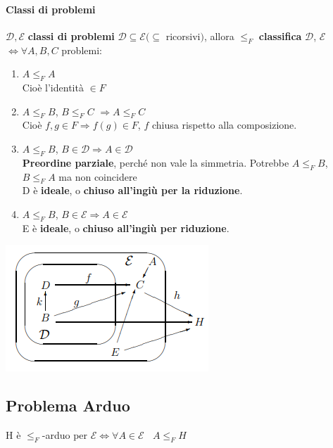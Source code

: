 \documentclass[10pt]{book}
\begin{document}
\paragraph{Classi di problemi} $\mathscr{D}, \mathscr{E}$ \textbf{classi di problemi} $\mathscr{D} \subseteq \mathscr{E} (\subseteq$ ricorsivi$)$, allora $\leq_F$ \textbf{classifica} $\mathscr{D}$, $\mathscr{E}$ $\Leftrightarrow \forall A, B, C$ problemi:
\begin{multicols}{2}
\begin{enumerate}
	\item $A \leq_F A$\\ Cioè l'identità $\in F$
	\item $A \leq_F B$, $B \leq_F C$ $\Rightarrow A \leq_F C$\\ Cioè $f, g \in F \Rightarrow f(g) \in F$, $f$ chiusa rispetto alla composizione.
	\item $A \leq_F B$, $B \in \mathscr{D} \Rightarrow A \in \mathscr{D}$\\
	\textbf{Preordine parziale}, perché non vale la simmetria. Potrebbe $A \leq_F B$, $B \leq_F A$ ma non coincidere\\
	D è \textbf{ideale}, o \textbf{chiuso all'ingiù per la riduzione}.
	\item $A \leq_F B$, $B \in \mathscr{E} \Rightarrow A \in \mathscr{E}$\\
	E è \textbf{ideale}, o \textbf{chiuso all'ingiù per riduzione}.
\end{enumerate}
\begin{center}
	\includegraphics[scale=1]{1.png}
\end{center}
\end{multicols}
\pagebreak
\subsection{Problema Arduo}
H è $\leq_F$-arduo per $\mathscr{E} \Leftrightarrow \forall A \in \mathscr{E}\:\:\:\: A \leq_F H$
\end{document}
